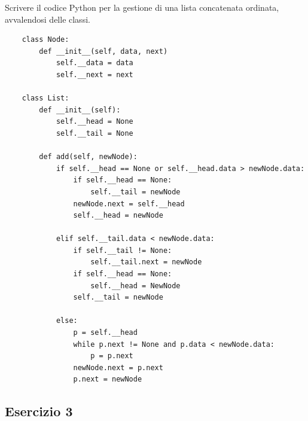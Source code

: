 \documentclass{article}
\numberwithin{equation}{section}
\begin{document}
Scrivere il codice Python per la gestione di una lista concatenata ordinata, avvalendosi delle classi. \\
\begin{verbatim}
    class Node:
        def __init__(self, data, next)
            self.__data = data
            self.__next = next

    class List:
        def __init__(self):
            self.__head = None
            self.__tail = None

        def add(self, newNode):            
            if self.__head == None or self.__head.data > newNode.data:
                if self.__head == None:
                    self.__tail = newNode
                newNode.next = self.__head
                self.__head = newNode

            elif self.__tail.data < newNode.data:
                if self.__tail != None:
                    self.__tail.next = newNode
                if self.__head == None:
                    self.__head = NewNode
                self.__tail = newNode

            else:            
                p = self.__head
                while p.next != None and p.data < newNode.data:
                    p = p.next
                newNode.next = p.next
                p.next = newNode
\end{verbatim}

\subsection{Esercizio 3}
\end{document}
